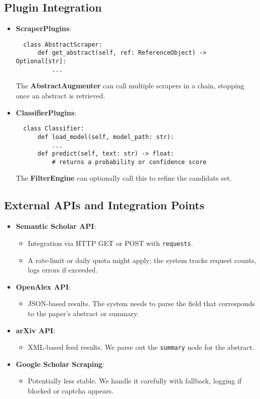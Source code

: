 \documentclass[12pt]{article}
\begin{document}
\subsection{Plugin Integration}
\begin{itemize}
  \item \textbf{ScraperPlugins}:
  \begin{verbatim}
  class AbstractScraper:
      def get_abstract(self, ref: ReferenceObject) -> Optional[str]:
          ...
  \end{verbatim}
  The \textbf{AbstractAugmenter} can call multiple scrapers in a chain, stopping once an abstract is retrieved.

  \item \textbf{ClassifierPlugins}:
  \begin{verbatim}
  class Classifier:
      def load_model(self, model_path: str):
          ...
      def predict(self, text: str) -> float:
          # returns a probability or confidence score
  \end{verbatim}
  The \textbf{FilterEngine} can optionally call this to refine the candidate set.
\end{itemize}

\subsection{External APIs and Integration Points}
\begin{itemize}
  \item \textbf{Semantic Scholar API}: 
    \begin{itemize}
      \item Integration via HTTP GET or POST with \texttt{requests}.
      \item A rate-limit or daily quota might apply; the system tracks request counts, logs errors if exceeded.
    \end{itemize}
  \item \textbf{OpenAlex API}: 
    \begin{itemize}
      \item JSON-based results. The system needs to parse the field that corresponds to the paper’s abstract or summary.
    \end{itemize}
  \item \textbf{arXiv API}: 
    \begin{itemize}
      \item XML-based feed results. We parse out the \texttt{summary} node for the abstract.
    \end{itemize}
  \item \textbf{Google Scholar Scraping}: 
    \begin{itemize}
      \item Potentially less stable. We handle it carefully with fallback, logging if blocked or captcha appears.
    \end{itemize}
\end{itemize}
\end{document}

